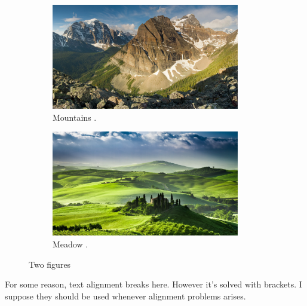 \documentclass[a4paper]{report}
\begin{document}
\begin{figure}[h]
	
	\begin{subfigure}{.5\textwidth}
		\centering
		\includegraphics[width = 0.9\textwidth]{Mountains}
		\caption{Mountains \cite{Nature}.}
	\end{subfigure}%
	\begin{subfigure}{.5\textwidth}
		\centering
		\includegraphics[width = 0.9\textwidth]{Meadow}
		\caption{Meadow \cite{Nature}.}
	\end{subfigure}
	\caption{Two figures}
	
\end{figure}

{For some reason, text alignment breaks here. However it's solved with brackets. I suppose they should be used whenever alignment problems arises.\\}
\end{document}
